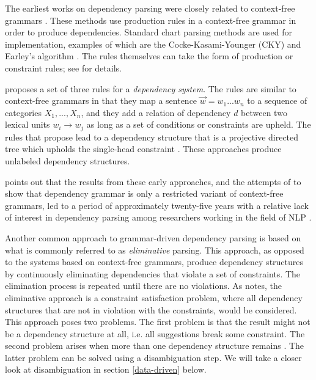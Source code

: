
The earliest works on dependency parsing were closely related to context-free grammars \cite{KublerEtAl:09}. These methods use production rules in a context-free grammar in order to produce dependencies. Standard chart parsing methods are used for implementation, examples of which are the Cocke-Kasami-Younger (CKY) \cite{Younger:67} and Earley's algorithm \cite{Early:70}. The rules themselves can take the form of production or constraint rules; see  for details.

\citeauthor{Gaifman:65} proposes a set of three rules for a \textit{dependency system}. The rules are similar to context-free grammars in that they map a sentence $\vec{w} = w_1 ... w_n$ to a sequence of categories $X_1, ..., X_n$, and they add a relation of dependency $d$ between two lexical units $w_i \rightarrow w_j$ as long as a set of conditions or constraints are upheld. The rules that \citeauthor{Gaifman:65} propose lead to a dependency structure that is a projective directed tree which upholds the single-head constraint \cite{Gaifman:65}. These approaches produce unlabeled dependency structures.

\citeauthor{Niv:05} points out that the results from these early approaches, and the attempts of \citeauthor{Gaifman:65} to show that dependency grammar is only a restricted variant of context-free grammars, led to a period of approximately twenty-five years with a relative lack of interest in dependency parsing among researchers working in the field of NLP \cite{Niv:05}.

Another common approach to grammar-driven dependency parsing is based on what is commonly referred to as \textit{eliminative} parsing. This approach, as opposed to the systems based on context-free grammars, produce dependency structures by continuously eliminating dependencies that violate a set of constraints. The elimination process is repeated until there are no violations. As \citeauthor{Niv:05} notes, the eliminative approach is a constraint satisfaction problem, where all dependency structures that are not in violation with the constraints, would be considered. This approach poses two problems. The first problem is that the result might not be a dependency structure at all, i.e. all suggestions break some constraint. The second problem arises when more than one dependency structure remains \cite{Niv:05}. The latter problem can be solved using a disambiguation step. We will take a closer look at disambiguation in section \ref{data-driven} below.

